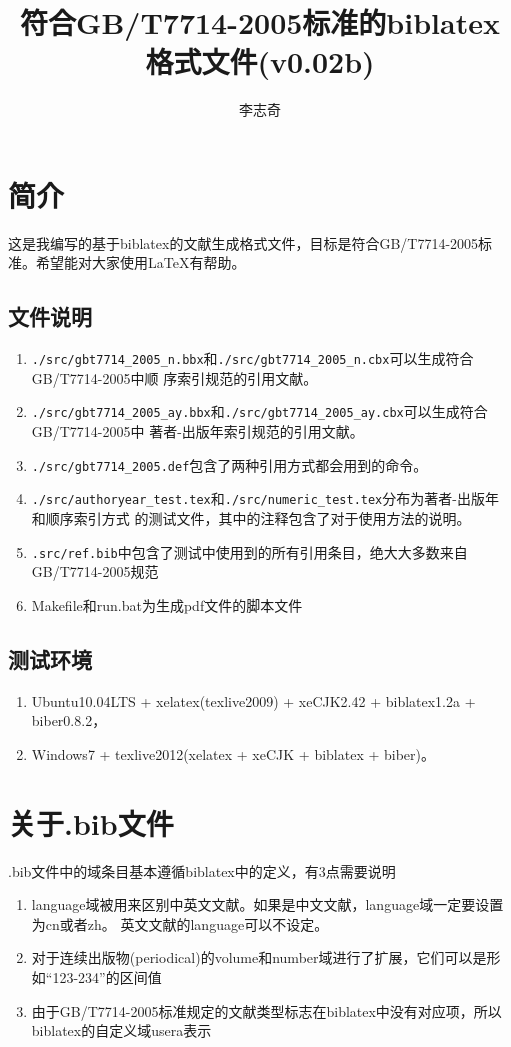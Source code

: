 \documentclass{article}
\title{符合GB/T7714-2005标准的biblatex格式文件(v0.02b)}
\author{李志奇}
\begin{document}
\maketitle

\section{简介}
	这是我编写的基于biblatex的文献生成格式文件，目标是符合GB/T7714-2005标准。希望能对大家使用\LaTeX 有帮助。
	\subsection{文件说明}
	\begin{enumerate}
		\item \verb|./src/gbt7714_2005_n.bbx|和\verb|./src/gbt7714_2005_n.cbx|可以生成符合GB/T7714-2005中顺
			序索引规范的引用文献。
	
		\item \verb|./src/gbt7714_2005_ay.bbx|和\verb|./src/gbt7714_2005_ay.cbx|可以生成符合GB/T7714-2005中
			著者-出版年索引规范的引用文献。
	
		\item \verb|./src/gbt7714_2005.def|包含了两种引用方式都会用到的命令。
	
		\item \verb|./src/authoryear_test.tex|和\verb|./src/numeric_test.tex|分布为著者-出版年和顺序索引方式
			的测试文件，其中的注释包含了对于使用方法的说明。
	
		\item \verb|.src/ref.bib|中包含了测试中使用到的所有引用条目，绝大大多数来自GB/T7714-2005规范
	
		\item Makefile和run.bat为生成pdf文件的脚本文件
	\end{enumerate}
	
   \subsection{测试环境}
   \begin{enumerate}
		\item Ubuntu10.04LTS + xelatex(texlive2009) + xeCJK2.42 + biblatex1.2a +
			biber0.8.2，
		\item Windows7 + texlive2012(xelatex + xeCJK + biblatex + biber)。
	\end{enumerate}
	
\section{关于.bib文件}
	.bib文件中的域条目基本遵循biblatex中的定义，有3点需要说明
	\begin{enumerate}
		\item language域被用来区别中英文文献。如果是中文文献，language域一定要设置为cn或者zh。
			英文文献的language可以不设定。
		\item 对于连续出版物(periodical)的volume和number域进行了扩展，它们可以是形如``123-234''的区间值
		\item 由于GB/T7714-2005标准规定的文献类型标志在biblatex中没有对应项，所以biblatex的自定义域usera表示
	\end{enumerate}
\end{document}
